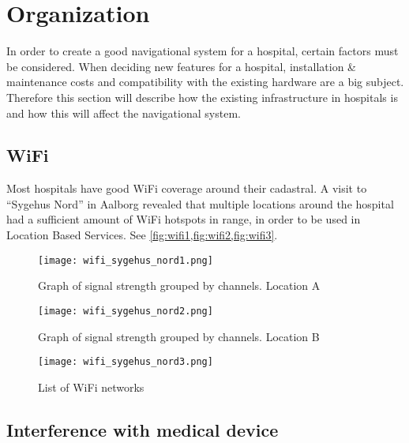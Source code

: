 \section{Organization} %
\label{sec:organization}



In order to create a good navigational system for a hospital, certain factors must be considered. When deciding new features for a hospital, installation \& maintenance costs and compatibility with the existing hardware are a big subject. Therefore this section will describe how the existing infrastructure in hospitals is and how this will affect the navigational system.

\subsection{WiFi}

Most hospitals have good WiFi coverage around their cadastral. A visit to \enquote{Sygehus Nord} in Aalborg revealed that multiple locations around the hospital had a sufficient amount of WiFi hotspots in range, in order to be used in Location Based Services. See \cref{fig:wifi1,fig:wifi2,fig:wifi3}.

\begin{figure}
\centering
  \begin{minipage}{0.45\textwidth}
    \centering
    \texttt{[image: wifi\_sygehus\_nord1.png]}
    \caption{Graph of signal strength grouped by channels. Location A} \label{fig:wifi1}
  \end{minipage}
  \hfill
  \begin{minipage}{0.45\textwidth}
    \centering
    \texttt{[image: wifi\_sygehus\_nord2.png]}
    \caption{Graph of signal strength grouped by channels. Location B} \label{fig:wifi2}
  \end{minipage}
    \begin{minipage}{0.45\textwidth}
    \centering
    \texttt{[image: wifi\_sygehus\_nord3.png]}
    \caption{List of WiFi networks} \label{fig:wifi3}
  \end{minipage}
  \end{figure}


\subsection{Interference with medical device}

